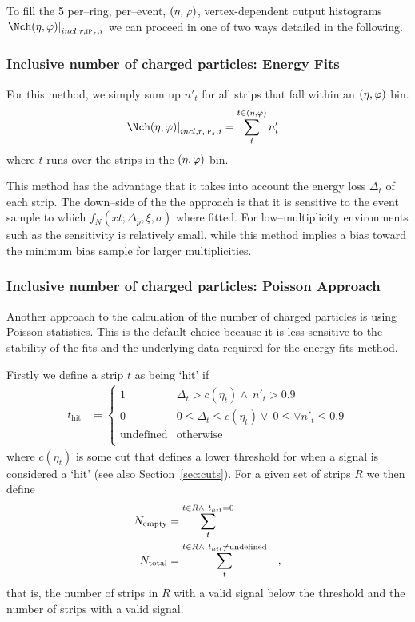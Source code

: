\documentclass[compat,11pt]{alicenote}
\newcommand*{\etaphi}{\ensuremath(\eta,\varphi)}
\newcommand{\secref}[1]{Section~\ref{#1}}
\newcommand{\dndetadphi}[1][]{{\ensuremath%
    \ifx|#1|\else\left.\fi%
      \Nch\etaphi%
      \ifx|#1|\else\right|_{#1}\fi}}
\newcommand\Ntotal{{\ensuremath N_{\text{total}}}}
\newcommand\Nempty{{\ensuremath N_{\text{empty}}}}
\begin{document}
To fill the 5 per--ring, per--event, $\etaphi$, vertex-dependent
output histograms $\dndetadphi[incl,r,\subIPz,i]$ we can proceed in
one of two ways detailed in the following.

\subsubsection{Inclusive number of charged particles: Energy Fits} 
\label{sec:sub:sub:eloss_fits}

For this method, we simply sum up $n'_t$ for all strips that fall
within an $\etaphi$ bin.  
\begin{align}
  \label{eq:density1}
  \dndetadphi[incl,r,\subIPz,i] &= \sum_t^{t\in\etaphi} n'_t
\end{align}
where $t$ runs over the strips in the $\etaphi$ bin. 

This method has the advantage that it takes into account the energy
loss $\Delta_t$ of each strip.  The down--side of the the approach is
that it is sensitive to the event sample to which
$f_N(xt;\Delta_p,\xi,\sigma)$ where fitted.  For low--multiplicity
environments such as \ppCol{} the sensitivity is relatively small,
while this method implies a bias toward the minimum bias sample for
larger multiplicities. 

\subsubsection{Inclusive number of charged particles: Poisson Approach} 
\label{sec:sub:sub:poisson}

\newcommand\muR{\ensuremath\mu}
Another approach to the calculation of the number of charged particles
is using Poisson statistics. This is the default choice because it is
less sensitive to the stability of the fits and the underlying data
required for the energy fits method. 

Firstly we define a strip $t$ as being `hit' if 
\begin{align*}
  t_{\text{hit}} &= \left\{ 
    \begin{array}{cl}
      1 & \Delta_t > c(\eta_t) \wedge\ n'_t > 0.9\\
      0 & 0 \leq \Delta_t \leq c(\eta_t)\vee\  0 \leq \vee n'_t \leq 0.9\\
      \text{undefined} & \text{otherwise}\\ 
    \end{array}\right.
\end{align*}
where $c(\eta_t)$ is some cut that defines a lower threshold for when
a signal is considered a `hit' (see also \secref{sec:cuts}).  For a
given set of strips $R$ we then define 
\begin{align*}
  \Nempty{} &= \sum_t^{t\in R\wedge\ t_{hit}=0}\\
  \Ntotal{} &= \sum_t^{t\in R\wedge\ t_{hit}\neq\text{undefined}}\quad,\\
\end{align*}
that is, the number of strips in $R$ with a valid signal below the
threshold and the number of strips with a valid signal. 
\end{document}
